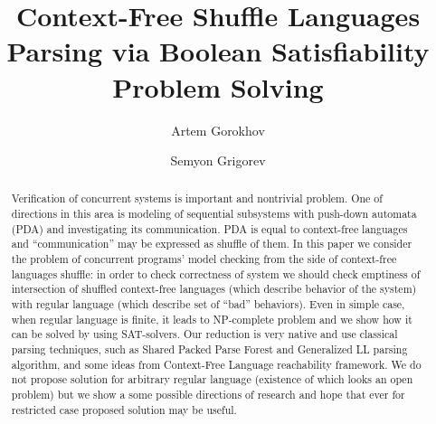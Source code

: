 \documentclass[sigconf]{acmart}
\begin{document}
\title{Context-Free Shuffle Languages Parsing via Boolean Satisfiability Problem Solving}


\author{Artem Gorokhov}

\author{Semyon Grigorev}



\begin{abstract}
    Verification of concurrent systems is important and nontrivial problem.
    One of directions in this area is modeling of sequential subsystems with push-down automata (PDA) and investigating its communication.
    PDA is equal to context-free languages and ``communication'' may be expressed as shuffle of them.
    In this paper we consider the problem of concurrent programs' model checking from the side of context-free languages shuffle:
    in order to check correctness of system we should check emptiness of intersection of shuffled context-free languages (which describe behavior of the system) with regular language (which describe set of ``bad'' behaviors).
    Even in simple case, when regular language is finite, it leads to NP-complete problem and we show how it can be solved by using SAT-solvers.
    Our reduction is very native and use classical parsing techniques, such as Shared Packed Parse Forest and Generalized LL parsing algorithm, and some ideas from Context-Free Language reachability framework.
    We do not propose solution for arbitrary regular language (existence of which looks an open problem) but we show a some possible directions of research and hope that ever for restricted case proposed solution may be useful.
\end{abstract}

%
%
\end{document}
